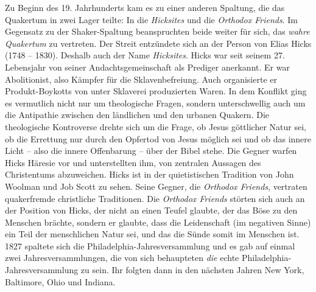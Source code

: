 Zu Beginn des 19. Jahrhunderts kam es zu einer anderen Spaltung, die das
Quakertum in zwei Lager teilte:
In die \textit{Hicksites} und die
\textit{Orthodox
Friends}. Im Gegensatz zu der Shaker-Spaltung
beanspruchten beide weiter für
sich, das \textit{wahre Quakertum} zu vertreten. Der Streit entzündete sich an
der Person von Elias Hicks (1748 -- 1830).
Deshalb
auch der Name \textit{Hicksites}.
Hicks war seit seinem 27. Lebensjahr von seiner Andachtsgemeinschaft als
Prediger
anerkannt. Er war Abolitionist, also Kämpfer
für die Sklavenbefreiung. Auch
organisierte er Produkt-Boykotts von unter Sklaverei produzierten Waren. In dem
Konflikt ging es vermutlich nicht nur um theologische Fragen, sondern
unterschwellig auch um die Antipathie zwischen den ländlichen und den urbanen
Quakern. Die theologische Kontroverse drehte sich um die Frage, ob Jesus
göttlicher Natur sei, ob die Errettung nur durch den Opfertod von Jesus möglich sei
und ob das innere Licht -- also die innere Offenbarung --
über der Bibel stehe.
Die Gegner warfen Hicks Häresie vor und unterstellten ihm, von zentralen
Aussagen des Christentums abzuweichen. Hicks ist in der quietistischen
 Tradition
von John Woolman und Job Scott
 zu sehen. Seine Gegner, die \textit{Orthodox
Friends}, vertraten quakerfremde christliche
Traditionen. Die
\textit{Orthodox Friends} störten sich auch an der Position von Hicks, der nicht
an einen Teufel glaubte, der das Böse zu den Menschen
brächte, sondern er
glaubte, dass die Leidenschaft (im negativen Sinne) ein Teil der menschlichen
Natur sei, und das die Sünde somit im Menschen ist. 1827 spaltete
sich die
Philadelphia-Jahresversammlung und es gab auf einmal zwei Jahresversammlungen,
die von sich behaupteten \textit{die} echte Philadelphia-Jahresversammlung zu
sein.
Ihr folgten dann in den nächsten Jahren New York,
Baltimore, Ohio und
Indiana.

\medskip

